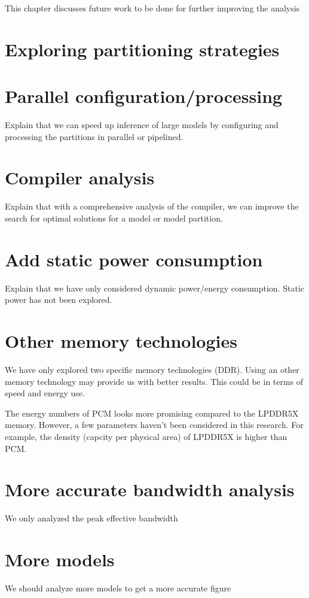This chapter discusses future work to be done for further improving the analysis

\section{Exploring partitioning strategies}


\section{Parallel configuration/processing}
Explain that we can speed up inference of large models by configuring and processing the partitions in parallel or pipelined.

\section{Compiler analysis}
Explain that with a comprehensive analysis of the compiler, we can improve the search for optimal solutions for a model or model partition.

\section{Add static power consumption}
Explain that we have only considered dynamic power/energy consumption.
Static power has not been explored.

\section{Other memory technologies}
We have only explored two specific memory technologies (DDR).
Using an other memory technology may provide us with better results.
This could be in terms of speed and energy use.

The energy numbers of PCM looks more promising compared to the LPDDR5X memory.
However, a few parameters haven't been considered in this research.
For example, the density (capcity per physical area) of LPDDR5X is higher than PCM.

\section{More accurate bandwidth analysis}
We only analyzed the peak effective bandwidth

\section{More models}
We should analyze more models to get a more accurate figure

